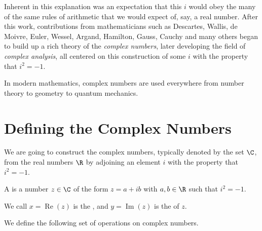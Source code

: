 \documentclass[a4]{scrreprt}
\begin{document}
Inherent in this explanation was an expectation that this $i$ would obey the many of the same rules of arithmetic that we would expect of, say, a real number. After this work, contributions from mathematicians such as Descartes, Wallis, de Moivre, Euler, Wessel, Argand, Hamilton, Gauss, Cauchy and many others began to build up a rich theory of the \emph{complex numbers}, later developing the field of \emph{complex analysis}, all centered on this construction of some $i$ with the property that $i^2 = -1$. 

In modern mathematics, complex numbers are used everywhere from number theory to geometry to quantum mechanics.

\section{Defining the Complex Numbers}

We are going to construct the complex numbers, typically denoted by the set $\C$, from the real numbers $\R$ by adjoining an element $i$ with the property that $i^2 = -1$.

\begin{definition}
	A  is a number $z \in \C$ of the form $z = a + ib$ with $a, b \in \R$ such that $i^2 = -1$. 
	
	We call $x = \operatorname{Re}(z)$ is the , and $y = \operatorname{Im}(z)$ is the  of $z$.
\end{definition}

We define the following set of operations on complex numbers.
\end{document}

